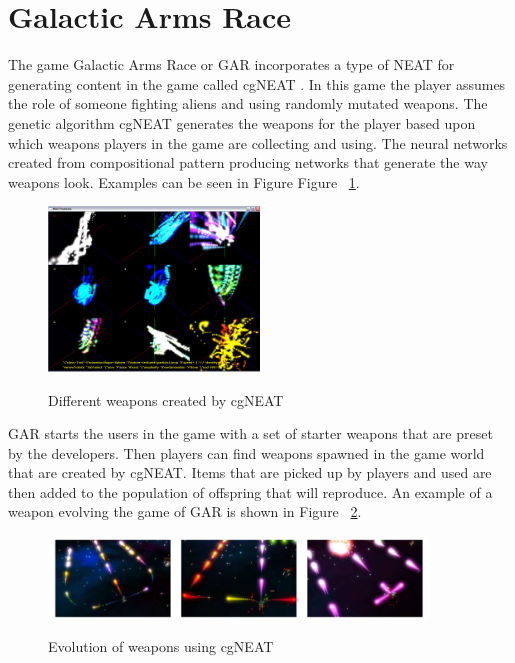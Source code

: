 \documentclass[12pt]{ucthesis} \newif\ifpdf \ifx\pdfoutput\undefined
\begin{document}
\section{Galactic Arms Race}

The game Galactic Arms Race or GAR incorporates a type of NEAT for generating
content in the game called cgNEAT \cite{hastings2009evolving}. In this game the player
assumes the role of someone fighting aliens and using randomly mutated
weapons.
The genetic algorithm cgNEAT generates the weapons for the player based
upon which weapons players in the game are collecting and using. The
neural networks created from compositional pattern producing networks that
generate the way weapons look\cite{hastings2009evolving}. Examples can be
seen in Figure Figure ~\ref{fig:weapons}.

\begin{figure}[h!] 
\caption{Different weapons created by cgNEAT}
  \centering
    \includegraphics[width=0.5\textwidth]{weapons.jpg}
   \label{fig:weapons} 
\end{figure}

GAR starts the users in the game with a set of starter weapons that are preset
by the developers. Then players can find weapons spawned in the game world that
are created by cgNEAT. Items that are picked up by players and used are then
added to the population of offspring that will reproduce. An example of a weapon
evolving the game of GAR is shown in Figure ~\ref{fig:evoguns}.

\begin{figure}[h!] 
\caption{Evolution of weapons using cgNEAT}
  \centering
    \includegraphics[width=0.9\textwidth]{evoguns.png}
   \label{fig:evoguns} 
\end{figure}
\end{document}
